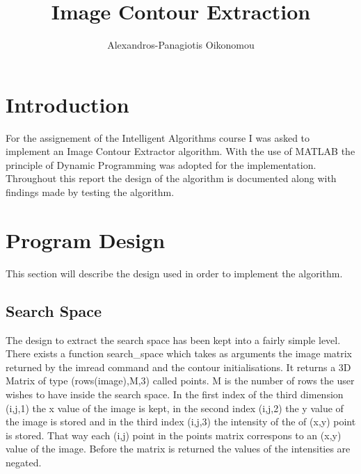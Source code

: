 \documentclass[12pt,a4paper,twocolumn]{article}
\author{Alexandros-Panagiotis Oikonomou}
\title{Image Contour Extraction}
\begin{document}
\maketitle
\newpage
\thispagestyle{empty}
\mbox{}
\newpage
\thispagestyle{empty}
\mbox{}
\newpage
\thispagestyle{empty}
\mbox{}
\section{Introduction}
For the assignement of the Intelligent Algorithms course I was asked to implement an Image Contour Extractor algorithm. With the use of MATLAB the principle of Dynamic Programming was adopted for the implementation. Throughout this report the design of the algorithm is documented along with findings made by testing the algorithm. 
\section{Program Design}
This section will describe the design used in order to implement the algorithm.
\subsection{Search Space}
The design to extract the search space has been kept into a fairly simple level. There exists a function search\_space which takes as arguments the image matrix returned by the imread command and the contour initialisations. It returns a 3D Matrix of type (rows(image),M,3) called points. M is the number of rows the user wishes to have inside the search space. In the first index of the third dimension (i,j,1) the x value of the image is kept, in the second index (i,j,2) the y value of the image is stored and in the third index (i,j,3) the intensity of the of (x,y) point is stored. That way each (i,j) point in the points matrix correspons to an (x,y) value of the image. Before the matrix is returned the values of the intensities are negated.
\end{document}
